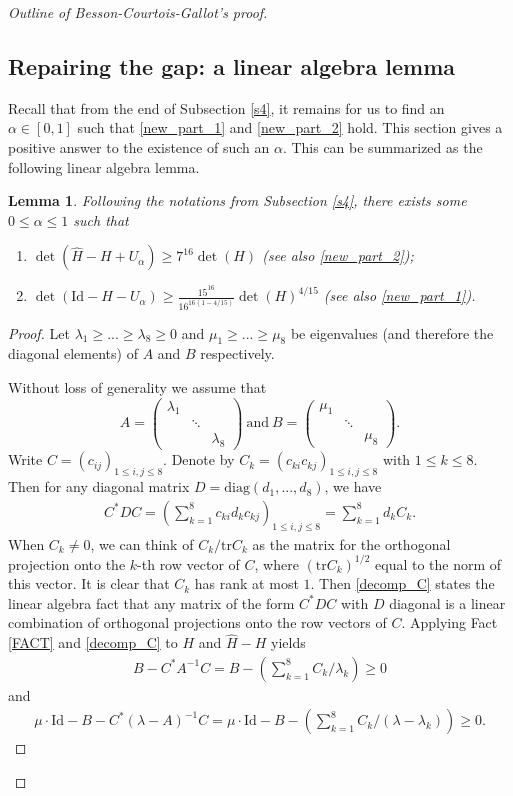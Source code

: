 \documentclass{article}
\newcommand{\id}{\mathrm{Id}}
\newcommand{\tr}{\mathrm{tr}}
\newcommand{\matiii}[3]{\left(\begin{array}{ccc} #1\\#2\\#3\end{array}\right)}
\newtheorem{lem}[thm]{Lemma}
\theoremstyle{definition}
\begin{document}
\begin{proof}[Outline of Besson-Courtois-Gallot's proof]
\subsection{Repairing the gap: a linear algebra lemma}\label{s5}
Recall that from the end of Subsection \ref{s4}, it remains for us to find an $\alpha\in[0,1]$ such that \eqref{new_part_1} and \eqref{new_part_2} hold. This section gives a positive answer to the existence of such an $\alpha$. This can be summarized as the following linear algebra lemma.
\begin{lem}\label{key_lemma}
Following the notations from Subsection \ref{s4}, there exists some $0\leq\alpha\leq 1$ such that
\begin{enumerate}
\item[(1).] $\det(\widehat{H}-H+U_\alpha)\geq 7^{16}\det(H)$ (see also \eqref{new_part_2});
\item[(2).] $\det(\id-H-U_\alpha)\geq\frac{15^{16}}{16^{16(1-4/15)}}\det(H)^{4/15}$ (see also \eqref{new_part_1}).
\end{enumerate}
\end{lem}
\begin{proof}
Let $\lambda_1\geq...\geq\lambda_8\geq0$ and $\mu_1\geq...\geq\mu_8$ be eigenvalues (and therefore the diagonal elements) of $A$ and $B$ respectively. 

Without loss of generality we assume that 
$$A=\matiii{\lambda_1&&}{&\ddots&}{&&\lambda_8}\mathrm{~and~}B=\matiii{\mu_1&&}{&\ddots&}{&&\mu_8}.$$
Write $C=(c_{ij})_{1\leq i,j\leq8}$. Denote by $C_k=(c_{ki}c_{kj})_{1\leq i,j\leq 8}$ with $1\leq k\leq 8$. Then for any diagonal matrix $D=\mathrm{diag}(d_1,...,d_8)$, we have 
\begin{align}\label{decomp_C}C^*DC=\left(\sum_{k=1}^8c_{ki}d_kc_{kj}\right)_{1\leq i,j\leq 8}=\sum_{k=1}^8 d_kC_k.\end{align}
When $C_k\neq 0$, we can think of $C_k/\tr C_k$ as the matrix for the orthogonal projection onto the $k$-th row vector of $C$, where $(\tr C_k)^{1/2}$ equal to the norm of this vector. It is clear that $C_k$ has rank at most $1$. Then \eqref{decomp_C} states the linear algebra fact that any matrix of the form $C^*DC$ with $D$ diagonal is a linear combination of orthogonal projections onto the row vectors of $C$. Applying Fact \ref{FACT} and \eqref{decomp_C} to $H$ and $\widehat{H}-H$ yields
\begin{align}\label{**}B-C^*A^{-1}C=B-\left(\sum_{k=1}^8C_k/\lambda_k\right)\geq 0\end{align}
and 
\begin{align}\label{***}\mu\cdot\id-B-C^*(\lambda-A)^{-1}C=\mu\cdot\id-B-\left(\sum_{k=1}^8C_k/(\lambda-\lambda_k)\right)\geq 0.\end{align}


\end{proof}
\end{proof}
\end{document}
